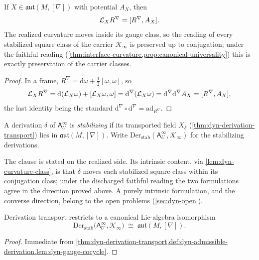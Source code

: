 \begin{lemma}
	\label{lem:dyn-curvature-class}
	If \(X\in\mathfrak{aut}(M,[\nabla])\) with potential \(A_X\), then
	\[
		\mathcal L_XR^\nabla=[R^\nabla,A_X].
	\]
	The realized curvature moves inside its gauge class, so the reading
	of every stabilized square class of the carrier
	\(\mathcal K_\infty\) is preserved up to conjugation; under the
	faithful reading
	(\cref{thm:interface-curvature,prop:canonical-universality}) this
	is exactly preservation of the carrier classes.
\end{lemma}
\begin{proof}
	In a frame, \(R^\nabla=\mathrm d\omega+\tfrac12[\omega,\omega]\),
	so
	\[
		\mathcal L_XR^\nabla
		=
		\mathrm d(\mathcal L_X\omega)+[\mathcal L_X\omega,\omega]
		=
		\mathrm d^\nabla(\mathcal L_X\omega)
		=
		\mathrm d^\nabla\mathrm d^\nabla A_X
		=
		[R^\nabla,A_X],
	\]
	the last identity being the standard
	\(\mathrm d^\nabla\circ\mathrm d^\nabla=\mathrm{ad}_{R^\nabla}\).
\end{proof}

\begin{definition}
	\label{def:dyn-admissible-derivation}
	A derivation \(\delta\) of \(\mathsf A_U^\infty\) is
	\emph{stabilizing} if its transported field
	\(X_\delta\) (\cref{thm:dyn-derivation-transport}) lies in
	\(\mathfrak{aut}(M,[\nabla])\). Write
	\(\mathrm{Der}_{\mathrm{stab}}(\mathsf A_U^\infty,\mathcal K_\infty)\)
	for the stabilizing derivations.
\end{definition}

\begin{remark}
	\label{rem:dyn-stabilization-intrinsic}
	The clause is stated on the realized side. Its intrinsic content,
	via \cref{lem:dyn-curvature-class}, is that \(\delta\) moves each
	stabilized square class within its conjugation class; under the
	discharged faithful reading the two formulations agree in the
	direction proved above. A purely intrinsic formulation, and the
	converse direction, belong to the open problems
	(\cref{sec:dyn-open}).
\end{remark}

\begin{corollary}
	\label{cor:dyn-stabilizer}
	Derivation transport restricts to a canonical Lie-algebra
	isomorphism
	\[
		\mathrm{Der}_{\mathrm{stab}}
		\bigl(\mathsf A_U^\infty,\mathcal K_\infty\bigr)
		\;\cong\;
		\mathfrak{aut}(M,[\nabla]).
	\]
\end{corollary}
\begin{proof}
	Immediate from
	\cref{thm:dyn-derivation-transport,def:dyn-admissible-derivation,lem:dyn-gauge-cocycle}.
\end{proof}

